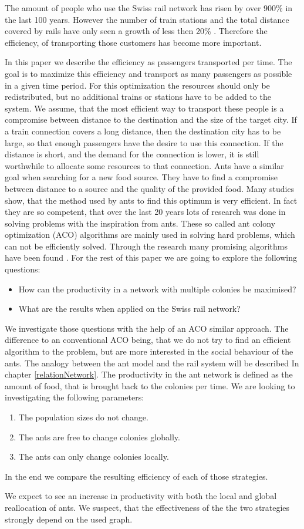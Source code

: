 The amount of people who use the Swiss rail network has risen by over 900\% in the last 100 years. However the number of train stations and the total distance covered by rails have only seen a growth of less then 20\% \citep{SbbStats}. Therefore the efficiency, of transporting those customers has become more important. 

In this paper we describe the efficiency as passengers transported per time. The goal is to maximize this efficiency and transport as many passengers as possible in a given time period. For this optimization the resources should only be redistributed, but no additional trains or stations have to be added to the system. We assume, that the most efficient way to transport these people is a compromise between distance to the destination and the size of the target city. If a train connection covers a long distance, then the destination city has to be large, so that enough passengers have the desire to use this connection. If the distance is short, and the demand for the connection is lower, it is still worthwhile to allocate some resources to that connection.
Ants have a similar goal when searching for a new food source. They have to find a compromise between distance to a source and the quality of the provided food. Many studies show, that the method used by ants to find this optimum is very efficient. In fact they are so competent, that over the last 20 years lots of research was done in solving problems with the inspiration from ants. These so called ant colony optimization (ACO) algorithms are mainly used in solving hard problems, which can not be efficiently solved. Through the research many promising algorithms have been found \citep{Aco1}.
For the rest of this paper we are going to explore the following questions:
\begin{itemize}
  \item How can the productivity in a network with multiple colonies be maximised?
  \item What are the results when applied on the Swiss rail network?
\end{itemize}
We investigate those questions with the help of an ACO similar approach. The difference to an conventional ACO being, that we do not try to find an efficient algorithm to the problem, but are more interested in the social behaviour of the ants. The analogy between the ant model and the rail system will be described In chapter \ref{relationNetwork}. The productivity in the ant network is defined as the amount of food, that is brought back to the colonies per time. We are looking to investigating the following parameters:
\begin{enumerate}
	\item The population sizes do not change.
	\item The ants are free to change colonies globally.
	\item The ants can only change colonies locally.
\end{enumerate}
In the end we compare the resulting efficiency of each of those strategies. 

We expect to see an increase in productivity with both the local and global reallocation of ants. We suspect, that the effectiveness of the the two strategies strongly depend on the used graph.